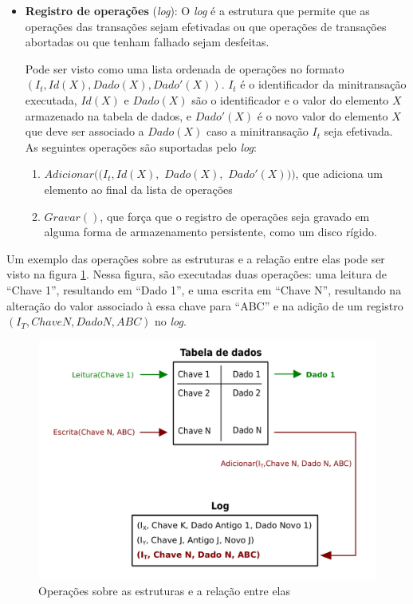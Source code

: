 \documentclass[11pt,twoside,a4paper]{book}
\begin{document}
\begin{itemize}
\item \textbf{Registro de operações} (\emph{log}): O \emph{log} é a estrutura que permite que as operações das transações sejam efetivadas ou que operações de transações abortadas ou que tenham falhado sejam desfeitas. 

Pode ser visto como uma lista ordenada de operações no formato $(I_t, Id(X), Dado(X), Dado'(X))$. $I_t$ é o identificador da minitransação executada, $Id(X)$ e $Dado(X)$ são o identificador e o valor do elemento $X$ armazenado na tabela de dados, e $Dado'(X)$ é o novo valor do elemento $X$ que deve ser associado a $Dado(X)$ caso a minitransação $I_t$ seja efetivada. As seguintes operações são suportadas pelo \emph{log}:

\begin{enumerate}
    \item $Adicionar((I_t, Id(X),$ $Dado(X),$ $Dado'(X)))$, que adiciona um elemento ao final da lista de operações

    \item $Gravar()$, que força que o registro de operações seja gravado em alguma forma de armazenamento persistente, como um disco rígido.
\end{enumerate}

\end{itemize}

Um exemplo das operações sobre as estruturas e a relação entre elas pode ser visto na figura \ref{fig:estruturas}. Nessa figura, são executadas duas operações: uma leitura de ``Chave 1'', resultando em ``Dado 1'', e uma escrita em ``Chave N'', resultando na alteração do valor associado à essa chave para ``ABC'' e na adição de um registro $(I_T, Chave N, Dado N, ABC)$ no \emph{log}.

\begin{figure}
  \centering
  \includegraphics[width=.90\textwidth]{estruturas} 
  \caption{Operações sobre as estruturas e a relação entre elas}
  \label{fig:estruturas} 
\end{figure}
\end{document}
